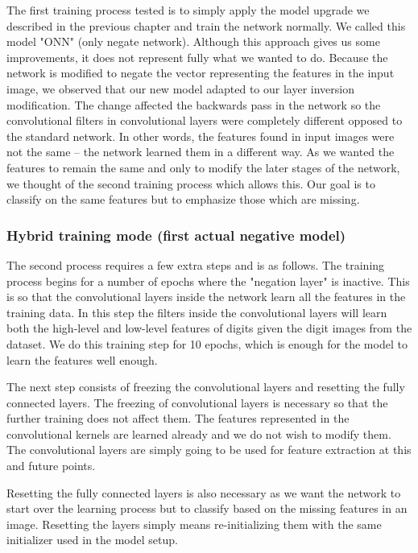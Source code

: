 \documentclass[b5paper]{book}
\begin{document}
The first training process tested is to simply apply the model upgrade we described in the previous chapter and train the network normally. We called this model "ONN" (only negate network). Although this approach gives us some improvements, it does not represent fully what we wanted to do. Because the network is modified to negate the vector representing the features in the input image, we observed that our new model adapted to our layer inversion modification. The change affected the backwards pass in the network so the convolutional filters in convolutional layers were completely different opposed to the standard network. In other words, the features found in input images were not the same -- the network learned them in a different way. As we wanted the features to remain the same and only to modify the later stages of the network, we thought of the second training process which allows this. Our goal is to classify on the same features but to emphasize those which are missing.

\subsubsection{Hybrid training mode (first actual negative model)}

The second process requires a few extra steps and is as follows. The training process begins for a number of epochs where the "negation layer" is inactive. This is so that the convolutional layers inside the network learn all the features in the training data. In this step the filters inside the convolutional layers will learn both the high-level and low-level features of digits given the digit images from the dataset. We do this training step for 10 epochs, which is enough for the model to learn the features well enough.

The next step consists of freezing the convolutional layers and resetting the fully connected layers. The freezing of convolutional layers is necessary so that the further training does not affect them. The features represented in the convolutional kernels are learned already and we do not wish to modify them. The convolutional layers are simply going to be used for feature extraction at this and future points. 

Resetting the fully connected layers is also necessary as we want the network to start over the learning process but to classify based on the missing features in an image. Resetting the layers simply means re-initializing them with the same initializer used in the model setup.
\end{document}
